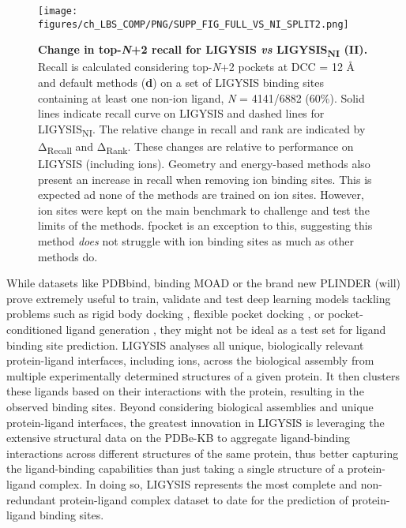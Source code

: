 \begin{figure}[htb!]
    \centering
    \texttt{[image: figures/ch\_LBS\_COMP/PNG/SUPP\_FIG\_FULL\_VS\_NI\_SPLIT2.png]}
   \caption[Change in top-\textit{N}+2 recall for LIGYSIS \textit{vs} LIGYSIS\textsubscript{NI} (II)]{\textbf{Change in top-\textit{N}+2 recall for LIGYSIS \textit{vs} LIGYSIS\textsubscript{NI} (II).} Recall is calculated considering top-\textit{N}+2 pockets at DCC = 12 \AA{} and default methods (\textbf{d}) on a set of LIGYSIS binding sites containing at least one non-ion ligand, \textit{N} = 4141/6882 (60\%). Solid lines indicate recall curve on LIGYSIS and dashed lines for LIGYSIS\textsubscript{NI}. The relative change in recall and rank are indicated by Δ\textsubscript{Recall} and Δ\textsubscript{Rank}. These changes are relative to performance on LIGYSIS (including ions). Geometry and energy-based methods also present an increase in recall when removing ion binding sites. This is expected ad none of the methods are trained on ion sites. However, ion sites were kept on the main benchmark to challenge and test the limits of the methods. fpocket is an exception to this, suggesting this method \textit{does} not struggle with ion binding sites as much as other methods do.}
    \label{fig:LIGYSIS_VS_LIGYSISNI_2}
\end{figure}

While datasets like PDBbind, binding MOAD or the brand new PLINDER \cite{DURAIRAJ_2024_PLINDER} (will) prove extremely useful to train, validate and test deep learning models tackling problems such as rigid body docking \cite{STARK_2022_EQUIBIND}, flexible pocket docking \cite{QIAO_2024_DGN}, or pocket-conditioned ligand generation \cite{SCHNEUING_2023_DIFFUSION}, they might not be ideal as a test set for ligand binding site prediction. LIGYSIS analyses all unique, biologically relevant protein-ligand interfaces, including ions, across the biological assembly from multiple experimentally determined structures of a given protein. It then clusters these ligands based on their interactions with the protein, resulting in the observed binding sites. Beyond considering biological assemblies and unique protein-ligand interfaces, the greatest innovation in LIGYSIS is leveraging the extensive structural data on the PDBe-KB to aggregate ligand-binding interactions across different structures of the same protein, thus better capturing the ligand-binding capabilities than just taking a single structure of a protein-ligand complex. In doing so, LIGYSIS represents the most complete and non-redundant protein-ligand complex dataset to date for the prediction of protein-ligand binding sites.

